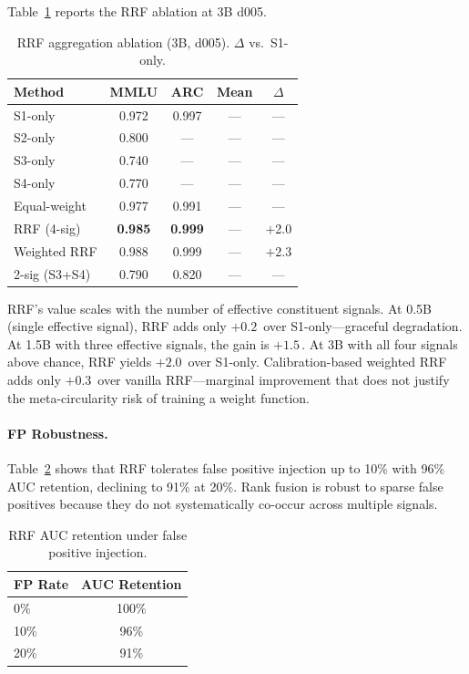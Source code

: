\documentclass[11pt,a4paper]{article}
\newcommand{\pp}{\,\text{pp}}
\begin{document}
Table~\ref{tab:rrf_ablation} reports the RRF ablation at 3B d005.

\begin{table}[t]
\centering
\small
\caption{RRF aggregation ablation (3B, d005). $\Delta$ vs.\ S1-only.}
\label{tab:rrf_ablation}
\begin{tabular}{lcccc}
\toprule
Method & MMLU & ARC & Mean & $\Delta$ \\
\midrule
S1-only        & 0.972 & 0.997 & --- & --- \\
S2-only        & 0.800 & --- & --- & --- \\
S3-only        & 0.740 & --- & --- & --- \\
S4-only        & 0.770 & --- & --- & --- \\
\midrule
Equal-weight   & 0.977 & 0.991 & --- & --- \\
RRF (4-sig)    & \textbf{0.985} & \textbf{0.999} & --- & $+$2.0 \\
Weighted RRF   & 0.988 & 0.999 & --- & $+$2.3 \\
2-sig (S3+S4)  & 0.790 & 0.820 & --- & --- \\
\bottomrule
\end{tabular}
\end{table}

RRF's value scales with the number of effective constituent signals.
At 0.5B (single effective signal), RRF adds only $+0.2$\pp{} over S1-only---graceful degradation.
At 1.5B with three effective signals, the gain is $+1.5$\pp{}.
At 3B with all four signals above chance, RRF yields $+2.0$\pp{} over S1-only.
Calibration-based weighted RRF adds only $+0.3$\pp{} over vanilla RRF---marginal improvement that does not justify the meta-circularity risk of training a weight function.

\paragraph{FP Robustness.}
Table~\ref{tab:fp_robust} shows that RRF tolerates false positive injection up to 10\% with 96\% AUC retention, declining to 91\% at 20\%.
Rank fusion is robust to sparse false positives because they do not systematically co-occur across multiple signals.

\begin{table}[t]
\centering
\small
\caption{RRF AUC retention under false positive injection.}
\label{tab:fp_robust}
\begin{tabular}{lc}
\toprule
FP Rate & AUC Retention \\
\midrule
0\%  & 100\% \\
10\% & 96\% \\
20\% & 91\% \\
\bottomrule
\end{tabular}
\end{table}
\end{document}
